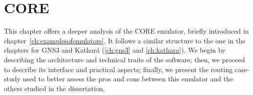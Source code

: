 
\chapter{CORE}
\label{ch:core}

This chapter offers a deeper analysis of the CORE emulator, briefly introduced in chapter~\ref{ch:examplesofemulators}.
It follows a similar structure to the one in the chapters for GNS3 and Kathará (\ref{ch:gns3} and \ref{ch:kathara}).
We begin by describing the architecture and technical traits of the software; then, we proceed to describe its interface and practical aspects; finally, we present the routing case-study used to better assess the pros and cons between this emulator and the others studied in the dissertation.









